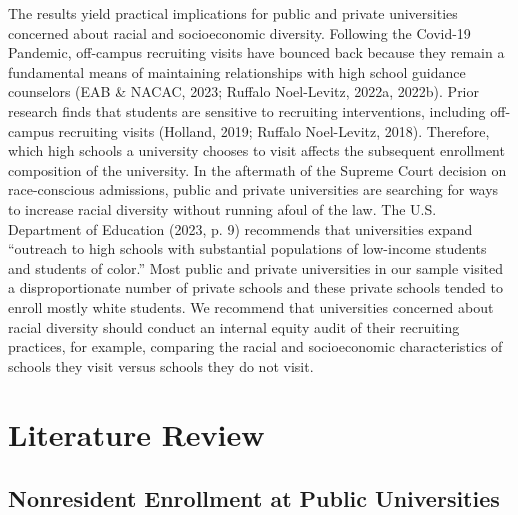 \documentclass[
  12pt,
]{article}
\begin{document}
The results yield practical implications for public and private universities concerned about racial and socioeconomic diversity. Following the Covid-19 Pandemic, off-campus recruiting visits have bounced back because they remain a fundamental means of maintaining relationships with high school guidance counselors (EAB \& NACAC, 2023; Ruffalo Noel-Levitz, 2022a, 2022b). Prior research finds that students are sensitive to recruiting interventions, including off-campus recruiting visits (Holland, 2019; Ruffalo Noel-Levitz, 2018). Therefore, which high schools a university chooses to visit affects the subsequent enrollment composition of the university. In the aftermath of the Supreme Court decision on race-conscious admissions, public and private universities are searching for ways to increase racial diversity without running afoul of the law. The U.S. Department of Education (2023, p. 9) recommends that universities expand ``outreach to high schools with substantial populations of low-income students and students of color.'' Most public and private universities in our sample visited a disproportionate number of private schools and these private schools tended to enroll mostly white students. We recommend that universities concerned about racial diversity should conduct an internal equity audit of their recruiting practices, for example, comparing the racial and socioeconomic characteristics of schools they visit versus schools they do not visit.

\section{Literature Review}\label{literature-review}

\subsection{Nonresident Enrollment at Public Universities}\label{nonresident-enrollment-at-public-universities}
\end{document}
